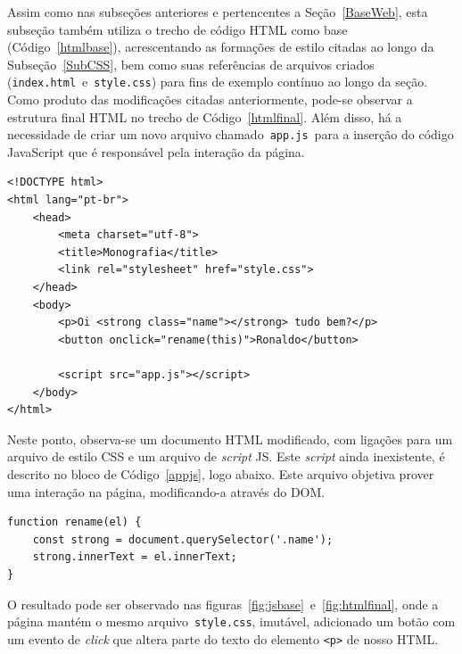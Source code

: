 Assim como nas subseções anteriores e pertencentes a Seção~\ref{BaseWeb}, esta subseção também utiliza o trecho de código HTML como base (Código~\ref{htmlbase}), acrescentando as formações de estilo citadas ao longo da Subseção~\ref{SubCSS}, bem como suas referências de arquivos criados (\texttt{index.html}~e~\texttt{style.css}) para fins de exemplo contínuo ao longo da seção. Como produto das modificações citadas anteriormente, pode-se observar a estrutura final HTML no trecho de Código~\ref{htmlfinal}. Além disso, há a necessidade de criar um novo arquivo chamado~\texttt{app.js}~para a inserção do código JavaScript que é responsável pela interação da página.
\begin{lstlisting}[label=htmlfinal,caption=Documento HTML com CSS e JS.]
<!DOCTYPE html>
<html lang="pt-br">
    <head>
        <meta charset="utf-8">
        <title>Monografia</title>
        <link rel="stylesheet" href="style.css">
    </head>
    <body>
        <p>Oi <strong class="name"></strong> tudo bem?</p>
        <button onclick="rename(this)">Ronaldo</button>
        
        <script src="app.js"></script>
    </body>
</html>
\end{lstlisting}

Neste ponto, observa-se um documento HTML modificado, com ligações para um arquivo de estilo CSS e um arquivo de \textit{script} JS. Este \textit{script} ainda inexistente, é descrito no bloco de Código~\ref{appjs}, logo abaixo. Este arquivo objetiva prover uma interação na página, modificando-a através do DOM.

\begin{lstlisting}[label=appjs,caption=Exemplo de um código JS.]
function rename(el) {
    const strong = document.querySelector('.name');
    strong.innerText = el.innerText;
}
\end{lstlisting}

O resultado pode ser observado nas figuras~\ref{fig:jsbase}~e~\ref{fig:htmlfinal}, onde a página mantém o mesmo arquivo~\texttt{style.css}, imutável, adicionado um botão com um evento de \textit{click} que altera parte do texto do elemento \texttt{<p>} de nosso HTML.

\begin{figure}[th]
\end{figure}

